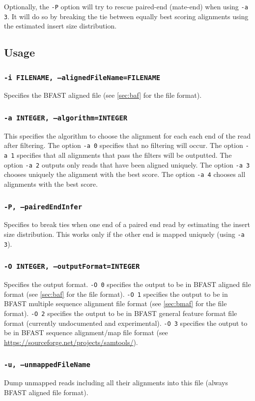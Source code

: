 \documentclass[a4paper,12pt]{book}
\newcommand{\TT}[1]{{\tt #1}} %
\newcommand{\BAF}{BFAST aligned file} %
\newcommand{\BMAF}{BFAST multiple sequence alignment file} %
\newcommand{\BGFFF}{BFAST general feature format file} %
\newcommand{\BSAMF}{BFAST sequence alignment/map file} %
\begin{document}
Optionally, the \TT{-P} option will try to rescue paired-end (mate-end) when using \TT{-a 3}.
It will do so by breaking the tie between equally best scoring alignments using the estimated insert size distribution.

\subsection{Usage}
\subsubsection{\TT{-i FILENAME, --alignedFileName=FILENAME}}
Specifies the \BAF{} (see \autoref{sec:baf} for the file format).

\subsubsection{\TT{-a INTEGER, --algorithm=INTEGER}}
This specifies the algorithm to choose the alignment for each each end of the read after filtering.
The option \TT{-a 0} specifies that no filtering will occur.
The option \TT{-a 1} specifies that all alignments that pass the filters will be outputted.
The option \TT{-a 2} outputs only reads that have been aligned uniquely.
The option \TT{-a 3} chooses uniquely the alignment with the best score.
The option \TT{-a 4} chooses all alignments with the best score.

\subsubsection{\TT{-P, --pairedEndInfer}}
Specifies to break ties when one end of a paired end read by estimating the insert size distribution.  
This works only if the other end is mapped uniquely (using \TT{-a 3}).
\subsubsection{\TT{-O INTEGER, --outputFormat=INTEGER}}
Specifies the output format.
\TT{-O 0} specifies the output to be in \BAF{} format (see \autoref{sec:baf} for the file format).
\TT{-O 1} specifies the output to be in \BMAF{} format (see \autoref{sec:bmaf} for the file format).
\TT{-O 2} specifies the output to be in \BGFFF{} format (currently undocumented and experimental).
\TT{-O 3} specifies the output to be in \BSAMF{} format (see \url{https://sourceforge.net/projects/samtools/}).

\subsubsection{\TT{-u, --unmappedFileName}}
Dump unmapped reads including all their alignments into this file (always \BAF{} format).
\end{document}
